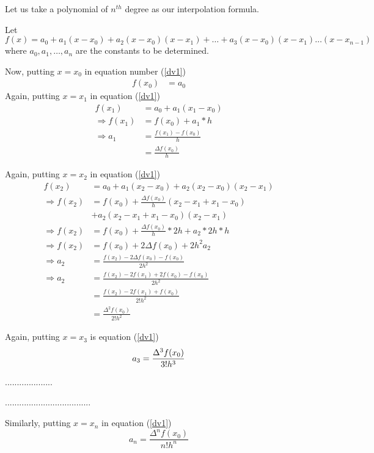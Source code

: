 \documentclass[11pt, a4paper]{article}
\begin{document}
Let us take a polynomial of $n^{th}$ degree as our interpolation formula.

Let 
\begin{equation}\label{dv1}
  f(x)=a_0+a_1(x-x_0)+a_2(x-x_0)(x-x_1)+\dots+a_3(x-x_0)(x-x_1)\dots(x-x_{n-1})
\end{equation}
where $a_0,a_1,\dots,a_n$ are the constants to be determined.

Now, putting $x=x_0$ in equation number (\ref{dv1}) 
\begin{align*}
  f(x_0)&=a_0
\end{align*}
Again, putting $x=x_1$ in equation (\ref{dv1})
\begin{align*}
  f(x_1)&=a_0+a_1(x_1-x_0)\\
  \Rightarrow f(x_1)&=f(x_0)+a_1*h\\
  \Rightarrow a_1 &=\frac{f(x_1)-f(x_0)}{h}\\
  &=\frac{\Delta f(x_0)}{h}
\end{align*}

Again, putting $x=x_2$ in equation (\ref{dv1})
\begin{align*}
              f(x_2)  &= a_0+a_1(x_2-x_0)+a_2(x_2-x_0)(x_2-x_1)\\
  \Rightarrow f(x_2)  &= f(x_0)+\frac{\Delta f(x_0)}{h}(x_2-x_1+x_1-x_0)\\ &+ a_2(x_2-x_1+x_1-x_0)(x_2-x_1)\\
  \Rightarrow f(x_2)  &= f(x_0)+\frac{\Delta f(x_0)}{h}*2h+a_2*2h*h\\
  \Rightarrow f(x_2)  &= f(x_0)+2\Delta f(x_0)+2h^2a_2\\
  \Rightarrow a_2     &= \frac{f(x_2)-2\Delta f(x_0)-f(x_0)}{2h^2}\\
  \Rightarrow a_2     &= \frac{f(x_2)-2f(x_1)+2f(x_0)-f(x_0)}{2h^2}\\
                      &= \frac{f(x_2)-2f(x_1)+f(x_0)}{2!h^2}\\
                      &= \frac{\Delta^2 f(x_0)}{2!h^2}
\end{align*}

Again, putting $x=x_3$ is equation (\ref{dv1})
\begin{equation*}
  a_3=\frac{\Delta^3f(x_0)}{3!h^3}\\
\end{equation*}

....................

....................................


Similarly, putting $x=x_n$ in equation (\ref{dv1})
\begin{equation*}
  a_n=\frac{\Delta^nf(x_0)}{n!h^n}
\end{equation*}
\end{document}
